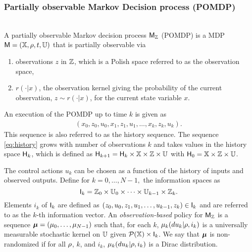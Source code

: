 \documentclass{ifacconf}
\begin{document}
 

\subsubsection{Partially observable Markov Decision process (POMDP)}\label{sec:POMDP}
\begin{definition} \label{def:MDP}\mbox{ }\\
A partially observable Markov decision process $\mathsf{M}_{{\mathbb{Z}}}$ (POMDP) is a MDP $\mathsf{M} = ({\mathbb{X}}, \rho, t, {\mathbb{U}})$  that is partially observable via  
\begin{enumerate}
	\item observations $z$ in ${\mathbb{Z}}$,  which is a Polish space referred to as the observation space, %
\item $r(\cdot|x)$,  the observation kernel giving the probability of the current observation,  $z\sim r(\cdot|x)$,  for the current state variable $x$.
\end{enumerate}


\end{definition} 

An execution of the POMDP  up to time $k$ is given as
\begin{align}\label{eq:history} (x_0,z_0,u_0,x_1,z_1,u_1,\ldots,x_k,z_k,u_k).\end{align}
This sequence is also referred to as the history sequence.
The sequence  \eqref{eq:history} grows with number of observations  $k$ and takes values in the history space ${\mathsf{H}}_k$, which is defined as
  ${\mathsf{H}}_{k+1}={\mathsf{H}}_{k}\times{\mathbb{X}}\times{\mathbb{Z}}\times {\mathbb{U}}$ with ${\mathsf{H}}_0={\mathbb{X}}\times{\mathbb{Z}}\times {\mathbb{U}}$.


The control actions $u_k$ can be chosen as a function of the history of inputs and observed outputs.  
Define for $k=0,\ldots,N-1,$ the information spaces as
\[{\mathsf{I}}_k={\mathbb{Z}}_0\times{\mathbb{U}}_0\times\dots\times{\mathbb{U}}_{k-1}\times{\mathbb{Z}}_k.\]
Elements $i_k$ of ${\mathsf{I}}_k$ are defined as $(z_0,u_0,z_1,u_1,\ldots,u_{k-1},z_k)\in{\mathsf{I}}_k$ and are referred to as the $k$-th information vector. 
	An \emph{observation-based} policy for $\mathsf{M}_{{\mathbb{Z}}}$ is a sequence ${\boldsymbol{\mu}}=({\mu}_0,\ldots,{\mu}_{N-1})$ such that, for each $k$, ${\mu}_k(du_k|\rho, i_k)$ is a universally measurable stochastic kernel on ${\mathbb{U}}$  given $\mathcal{P}({\mathbb{X}})\times {\mathsf{I}}_k$.
	We say that ${\boldsymbol{\mu}}$ is non-randomized if for all $\rho$, $k$, and $i_k$,    ${\mu}_k(du_k|\rho, i_k)$ is a Dirac distribution.
\end{document}

